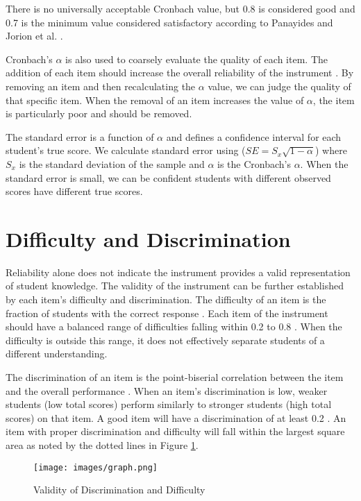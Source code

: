 There is no universally acceptable Cronbach value, but 0.8 is considered good and 0.7 is the minimum value considered satisfactory according to Panayides \cite{panayiotis} and Jorion et al. \cite{jorian}.     
     
Cronbach's $\alpha$ is also used to coarsely evaluate the quality of each item. The addition of each item should increase the overall reliability of the instrument \cite{dlci}. By removing an item and then recalculating the $\alpha$ value, we can judge the quality of that specific item. When the removal of an item increases the value of $\alpha$, the item is particularly poor and should be removed.     
     
The standard error is a function of $\alpha$ and defines a confidence interval for each student's true score. We calculate standard error using ($SE = S_x \sqrt{1-\alpha}$) where $S_x$ is the standard deviation of the sample and $\alpha$ is the Cronbach's $\alpha$. When the standard error is small, we can be confident students with different observed scores have different true scores.   


\section{Difficulty and Discrimination}

Reliability alone does not indicate the instrument provides a valid representation of student knowledge. The validity of the instrument can be further established by each item's difficulty and discrimination. The difficulty of an item is the fraction of students with the correct response \cite{og_ctt}.  Each item of the instrument should have a balanced range of difficulties falling within 0.2 to 0.8 \cite{dlci, jorian}. When the difficulty is outside this range, it does not effectively separate students of a different understanding.     
     
The discrimination of an item is the point-biserial correlation between the item and the overall performance \cite{jorian}. When an item's discrimination is low, weaker students (low total scores) perform similarly to stronger students (high total scores) on that item. A good item will have a discrimination of at least 0.2 \cite{dlci}. \iflong An item with proper discrimination and difficulty will fall within the largest square area as noted by the dotted lines in Figure \ref{fig:ideal}.\fi      
     
\iflong     
\begin{figure}[ht]     
    \begin{center}     
    \advance\leftskip-3cm     
    \advance\rightskip-3cm     
    \texttt{[image: images/graph.png]}     
    \caption{Validity of Discrimination and Difficulty}     
    \label{fig:ideal}     
\end{center}     
\end{figure}     
\fi     


